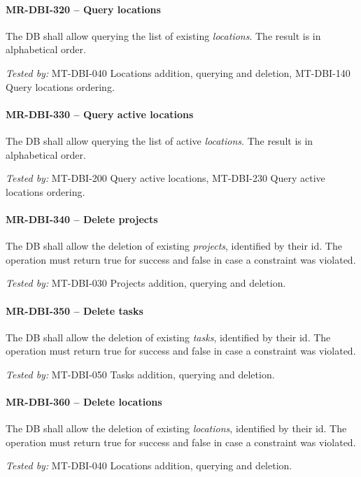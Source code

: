 \paragraph{MR-DBI-320 -- Query locations}
The \gls{DB} shall allow querying the list of existing \emph{locations}.
The result is in alphabetical order.

\textit{Tested by: } MT-DBI-040 Locations addition, querying and deletion,
MT-DBI-140 Query locations ordering.

\paragraph{MR-DBI-330 -- Query active locations}
The \gls{DB} shall allow querying the list of active \emph{locations}.
The result is in alphabetical order.

\textit{Tested by: } MT-DBI-200 Query active locations,
MT-DBI-230 Query active locations ordering.

\paragraph{MR-DBI-340 -- Delete projects}
The \gls{DB} shall allow the deletion of existing \emph{projects},
identified by their id.
The operation must return true for success and false in case a
constraint was violated.

\textit{Tested by: } MT-DBI-030 Projects addition, querying and deletion.

\paragraph{MR-DBI-350 -- Delete tasks}
The \gls{DB} shall allow the deletion of existing \emph{tasks},
identified by their id.
The operation must return true for success and false in case a
constraint was violated.

\textit{Tested by: } MT-DBI-050 Tasks addition, querying and deletion.

\paragraph{MR-DBI-360 -- Delete locations}
The \gls{DB} shall allow the deletion of existing \emph{locations},
identified by their id.
The operation must return true for success and false in case a
constraint was violated.

\textit{Tested by: } MT-DBI-040 Locations addition, querying and deletion.

